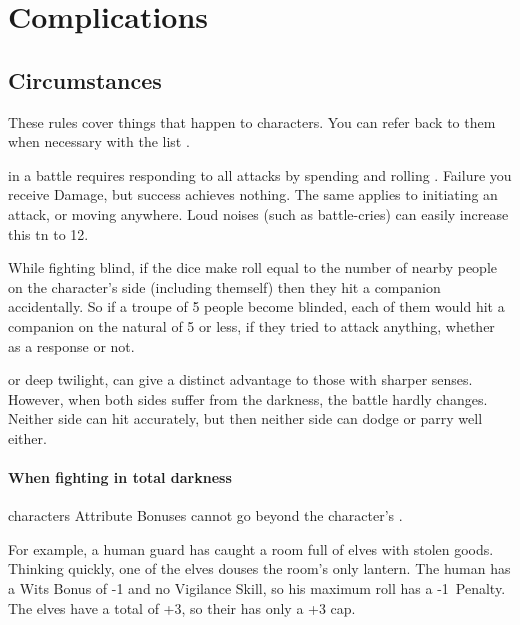 \projectilesChart

\startcontents[Manoeuvres]

\section{Complications}

\begin{multicols}{2}

\subsection{Circumstances}

These rules cover things that happen to characters.
You can refer back to them when necessary with the list .

in a battle requires responding to all attacks by spending  and rolling .
Failure you receive Damage, but success achieves nothing.
The same applies to initiating an attack, or moving anywhere.
Loud noises (such as battle-cries) can easily increase this \gls{tn} to 12.

While fighting blind, if the dice make  roll equal to the number of nearby people on the character's side (including themself) then they hit a companion accidentally.
So if a troupe of 5 people become blinded, each of them would hit a companion on the \gls{natural} of 5 or less, if they tried to attack anything, whether as a response or not.

\label{darkness}
or deep twilight, can give a distinct advantage to those with sharper senses.
However, when both sides suffer from the darkness, the battle hardly changes.
Neither side can hit accurately, but then neither side can dodge or parry well either.

\paragraph*{When fighting in total darkness}
characters Attribute Bonuses cannot go beyond the character's .

\begin{exampletext}
  For example, a human guard has caught a room full of elves with stolen goods.
  Thinking quickly, one of the elves douses the room's only lantern.
  The human has a Wits Bonus of -1 and no Vigilance Skill, so his maximum roll has a -1~Penalty.
  The elves have a total  of +3, so their  has only a +3 cap.
\end{exampletext}


\end{multicols}
